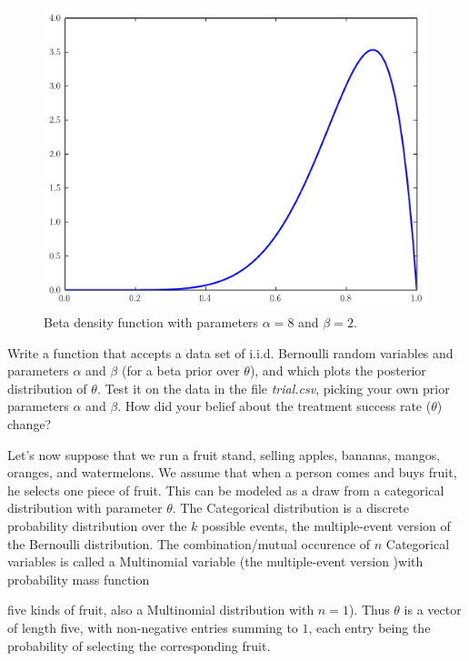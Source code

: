 \begin{figure}
\includegraphics[width=\textwidth]{beta_pdf.pdf}
\caption{Beta density function with parameters $\alpha = 8$ and $\beta = 2$.}
\label{fig:beta_pdf}
\end{figure}

\begin{problem}
Write a function that accepts a data set of i.i.d. Bernoulli random variables and parameters $\alpha$ and $\beta$ (for a beta prior over $\theta$), and which plots the posterior distribution of $\theta$. Test it on the data in the file \emph{trial.csv}, picking your own prior parameters $\alpha$ and $\beta$. How did your belief about the treatment success rate ($\theta$) change?
\end{problem}

Let's now suppose that we run a fruit stand, selling apples, bananas, mangos, oranges, and watermelons. We assume that when a person comes and buys fruit, he selects one piece of fruit. This can be modeled as a draw from a categorical distribution with parameter $\theta$. The Categorical distribution is a discrete probability distribution over the $k$ possible events, the multiple-event version of the Bernoulli distribution.  The combination/mutual occurence of $n$ Categorical variables is called a Multinomial variable (the multiple-event version )with probability mass function
$$$$

five kinds of fruit, also a Multinomial distribution with $n=1$). Thus $\theta$ is a vector of length five, with non-negative entries summing to $1$, each entry being the probability of selecting the corresponding fruit.

